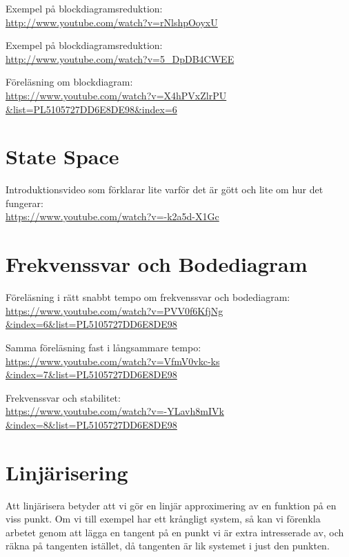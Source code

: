 \documentclass[a4paper]{article}
\begin{document}
Exempel på blockdiagramsreduktion:\\
\href{http://www.youtube.com/watch?v=rNlshpOoyxU}{http://www.youtube.com/watch?v=rNlshpOoyxU}

Exempel på blockdiagramsreduktion:\\
\href{http://www.youtube.com/watch?v=5_DpDB4CWEE}{http://www.youtube.com/watch?v=5\_DpDB4CWEE}

Föreläsning om blockdiagram:\\
\href{https://www.youtube.com/watch?v=X4hPVxZlrPU&list=PL5105727DD6E8DE98&index=6}{https://www.youtube.com/watch?v=X4hPVxZlrPU\\\&list=PL5105727DD6E8DE98\&index=6}


\section{State Space}
Introduktionsvideo som förklarar lite varför det är gött och lite om hur det fungerar:\\
\href{https://www.youtube.com/watch?v=-k2a5d-X1Gc}{https://www.youtube.com/watch?v=-k2a5d-X1Gc}


\section{Frekvenssvar och Bodediagram}
Föreläsning i rätt snabbt tempo om frekvenssvar och bodediagram:\\
\href{https://www.youtube.com/watch?v=PVV0f6KfjNg&index=6&list=PL5105727DD6E8DE98}{https://www.youtube.com/watch?v=PVV0f6KfjNg\\\&index=6\&list=PL5105727DD6E8DE98}

Samma föreläsning fast i långsammare tempo:\\
\href{https://www.youtube.com/watch?v=VfmV0vkc-ks&index=7&list=PL5105727DD6E8DE98}{https://www.youtube.com/watch?v=VfmV0vkc-ks\\\&index=7\&list=PL5105727DD6E8DE98}

Frekvenssvar och stabilitet:\\
\href{https://www.youtube.com/watch?v=-YLavh8mIVk&index=8&list=PL5105727DD6E8DE98}{https://www.youtube.com/watch?v=-YLavh8mIVk\\\&index=8\&list=PL5105727DD6E8DE98}


\section{Linjärisering}
\label{sec:linjärisering}
Att linjärisera betyder att vi gör en linjär approximering av en funktion på en viss punkt. Om vi till exempel har ett krångligt system, så kan vi förenkla arbetet genom att lägga en tangent på en punkt vi är extra intresserade av, och räkna på tangenten istället, då tangenten är lik systemet i just den punkten.
\end{document}
